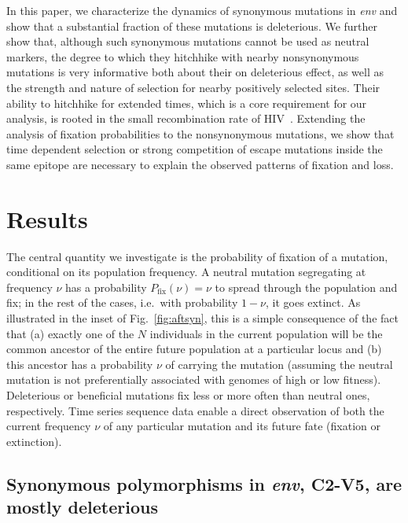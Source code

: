 \documentclass[rmp, twocolumn]{revtex4}
\newcommand{\FIG}[1]{Fig.~\ref{fig:#1}}
\newcommand{\env}{\textit{env}}
\begin{document}
In this paper, we characterize the dynamics of synonymous mutations in \env{}
and show that a substantial fraction of these mutations is deleterious. We
further show that, although such synonymous mutations cannot be used as neutral
markers, the degree to which they hitchhike with nearby nonsynonymous mutations
is very informative both about their on deleterious effect, as well as the
strength and nature of selection for nearby positively selected sites.
Their ability to hitchhike for extended times, which is a core requirement for
our analysis, is rooted in the small recombination rate of
HIV~\citep{neher_recombination_2010, batorsky_estimate_2011}. Extending the
analysis of fixation probabilities to the nonsynonymous mutations, we show that
time dependent selection or strong competition of escape mutations inside the
same epitope are necessary to explain the observed patterns of fixation and
loss.

\section{Results}

The central quantity we investigate is the probability of fixation of a
mutation, conditional on its population frequency.  A neutral mutation
segregating at frequency $\nu$ has a probability $P_\text{fix}(\nu) = \nu$ to
spread through the population and fix; in the rest of the cases, i.e.~with
probability $1-\nu$, it goes extinct. As illustrated in the inset of \FIG{aftsyn},
this is a simple consequence of the fact that
(a) exactly one of the $N$ individuals in the current population will be
the common ancestor of the entire future population at a particular locus and
(b) this ancestor has a probability $\nu$ of carrying the mutation (assuming
the neutral mutation is not preferentially associated with genomes of high or
low fitness).
Deleterious or beneficial mutations fix less or
more often than neutral ones, respectively. Time series sequence data enable a
direct observation of both the current frequency $\nu$ of any particular
mutation and its future fate (fixation or extinction). 


\subsection{Synonymous polymorphisms in \env, C2-V5, are mostly deleterious}
\end{document}
